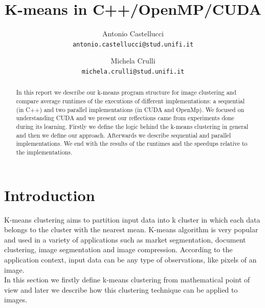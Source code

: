 \documentclass[10pt,twocolumn,letterpaper]{article}
\begin{document}
\title{K-means in C++/OpenMP/CUDA}

\author{Antonio Castellucci\\
{\tt\small antonio.castellucci@stud.unifi.it}
\and
Michela Crulli\\
{\tt\small michela.crulli@stud.unifi.it}
}

\maketitle
\thispagestyle{empty}


\begin{abstract}

In this report we describe our k-means program structure for image clustering and compare average runtimes of the executions of different implementations: a sequential (in C++) and two parallel implementations (in CUDA and OpenMp). We focused on understanding CUDA and we present our reflections came from experiments done during its learning.
Firstly we define the logic behind the k-means clustering in general and then we define our approach. Afterwards we describe sequential and parallel implementations. We end with the results of the runtimes and the speedups relative to the implementations.
 

\end{abstract}

\section{Introduction}

K-means clustering aims to partition input data into k cluster in which each data belongs to the cluster with the nearest mean. K-means algorithm is very popular and used in a variety of applications such as market segmentation, document clustering, image segmentation and image compression. According to the application context, input data can be any type of observations, like pixels of an image.\\
In this section we firstly define k-means clustering from mathematical point of view and later we describe how this clustering technique can be applied to images.
\newpage
\end{document}
